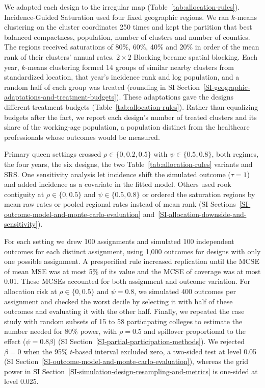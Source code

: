 \documentclass[Afour,sagev,times]{sagej}
\begin{document}
We adapted each design to the irregular map (Table~\ref{tab:allocation-rules}). Incidence-Guided Saturation used four fixed geographic regions. We ran $k$-means clustering on the cluster coordinates 250 times and kept the partition that best balanced compactness, population, number of clusters and number of counties. The regions received saturations of 80\%, 60\%, 40\% and 20\% in order of the mean rank of their clusters' annual rates. $2\times2$ Blocking became spatial blocking. Each year, $k$-means clustering formed 14 groups of similar nearby clusters from standardized location, that year's incidence rank and log population, and a random half of each group was treated (rounding in SI Section~\ref{SI-geographic-adaptations-and-treatment-budgets}). These adaptations gave the designs different treatment budgets (Table~\ref{tab:allocation-rules}). Rather than equalizing budgets after the fact, we report each design's number of treated clusters and its share of the working-age population, a population distinct from the healthcare professionals whose outcomes would be measured.

Primary queen settings crossed $\rho\in\{0,0.2,0.5\}$ with $\psi\in\{0.5,0.8\}$, both regimes, the four years, the six designs, the two Table~\ref{tab:allocation-rules} variants and SRS. One sensitivity analysis let incidence shift the simulated outcome ($\tau=1$) and added incidence as a covariate in the fitted model. Others used rook contiguity at $\rho\in\{0,0.5\}$ and $\psi\in\{0.5,0.8\}$ or ordered the saturation regions by mean raw rates or pooled regional rates instead of mean rank (SI Sections~\ref{SI-outcome-model-and-monte-carlo-evaluation} and~\ref{SI-allocation-downside-and-sensitivity}).

For each setting we drew 100 assignments and simulated 100 independent outcomes for each distinct assignment, using 1,000 outcomes for designs with only one possible assignment. A prespecified rule increased replication until the MCSE of mean MSE was at most 5\% of its value and the MCSE of coverage was at most 0.01. These MCSEs accounted for both assignment and outcome variation. For allocation risk at $\rho\in\{0,0.5\}$ and $\psi=0.8$, we simulated 400 outcomes per assignment and checked the worst decile by selecting it with half of these outcomes and evaluating it with the other half. Finally, we repeated the case study with random subsets of 15 to 58 participating colleges to estimate the number needed for 80\% power, with $\rho=0.5$ and spillover proportional to the effect ($\psi=0.8\beta$) (SI Section~\ref{SI-partial-participation-methods}). We rejected $\beta=0$ when the 95\% $t$-based interval excluded zero, a two-sided test at level 0.05 (SI Section~\ref{SI-outcome-model-and-monte-carlo-evaluation}), whereas the grid power in SI Section~\ref{SI-simulation-design-resampling-and-metrics} is one-sided at level 0.025.
\end{document}
